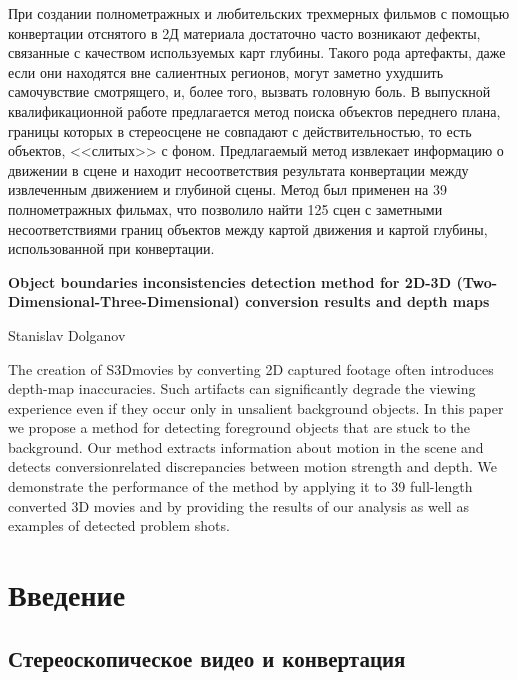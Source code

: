 \documentclass[14pt, a4paper]{extarticle}
\begin{document}
При создании полнометражных и любительских трехмерных фильмов с помощью 
конвертации отснятого в 2Д материала достаточно часто возникают дефекты, 
связанные с качеством используемых карт глубины. Такого рода артефакты, 
даже если они находятся вне салиентных регионов,  могут заметно ухудшить 
самочувствие смотрящего, и, более того, вызвать головную боль. В выпускной
квалификационной работе предлагается метод поиска объектов переднего плана, границы которых 
в стереосцене не совпадают с действительностью, то есть объектов, <<слитых>> 
с фоном. Предлагаемый метод извлекает информацию о движении в сцене и 
находит несоответствия результата конвертации между извлеченным движением и глубиной сцены.
Метод был применен на 39 полнометражных фильмах, что позволило найти 125 сцен 
с заметными несоответствиями границ объектов между картой движения и картой глубины, 
использованной при конвертации.

\vspace{2cm}

\textbf{Object boundaries inconsistencies detection method 
for 2D-3D (Two-Dimensional-Three-Dimensional)
conversion results and depth maps}

\vspace{0.5cm}
Stanislav Dolganov
\vspace{0.5cm}

The creation of S3Dmovies by converting 2D captured footage
often introduces depth-map inaccuracies. Such artifacts can
significantly degrade the viewing experience even if they occur
only in unsalient background objects.
In this paper we propose a method for detecting foreground
objects that are stuck to the background. Our method extracts
information about motion in the scene and detects conversionrelated
discrepancies between motion strength and depth. We
demonstrate the performance of the method by applying it
to 39 full-length converted 3D movies and by providing the
results of our analysis as well as examples of detected problem
shots.

\newpage
{}
\tableofcontents

\newpage
\section{Введение}

\subsection{Стереоскопическое видео и конвертация}
\end{document}
